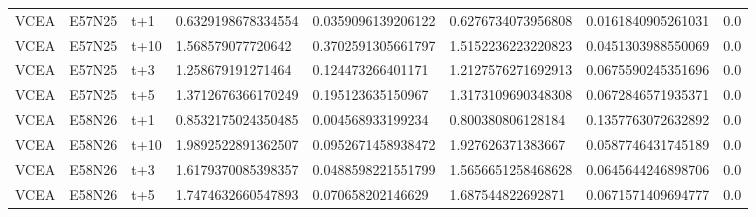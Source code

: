 \begin{landscape}
\begin{longtable}{llllllll}
VCEA & E57N25 & t+1 & 0.6329198678334554 & 0.0359096139206122 & 0.6276734073956808 & 0.0161840905261031 & 0.0 \\
VCEA & E57N25 & t+10 & 1.568579077720642 & 0.3702591305661797 & 1.5152236223220823 & 0.0451303988550069 & 0.0 \\
VCEA & E57N25 & t+3 & 1.258679191271464 & 0.124473266401171 & 1.2127576271692913 & 0.0675590245351696 & 0.0 \\
VCEA & E57N25 & t+5 & 1.3712676366170249 & 0.195123635150967 & 1.3173109690348308 & 0.0672846571935371 & 0.0 \\
VCEA & E58N26 & t+1 & 0.8532175024350485 & 0.004568933199234 & 0.800380806128184 & 0.1357763072632892 & 0.0 \\
VCEA & E58N26 & t+10 & 1.9892522891362507 & 0.0952671458938472 & 1.927626371383667 & 0.0587746431745189 & 0.0 \\
VCEA & E58N26 & t+3 & 1.6179370085398357 & 0.0488598221551799 & 1.5656651258468628 & 0.0645644246898706 & 0.0 \\
VCEA & E58N26 & t+5 & 1.7474632660547893 & 0.070658202146629 & 1.687544822692871 & 0.0671571409694777 & 0.0 \\
\bottomrule
\end{longtable}
\end{landscape}
